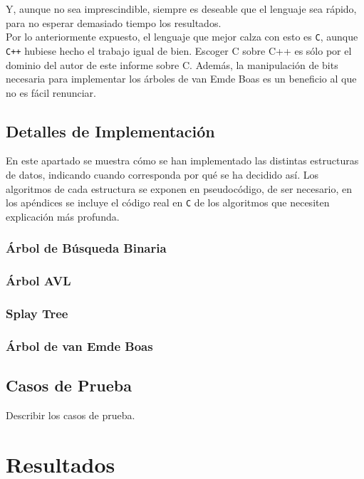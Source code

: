 \documentclass[12pt,letterpaper]{report}
\begin{document}
Y, aunque no sea imprescindible, siempre es deseable que el lenguaje sea rápido, para no esperar demasiado tiempo los resultados.\\

Por lo anteriormente expuesto, el lenguaje que mejor calza con esto es \texttt{C}, aunque \texttt{C++} hubiese hecho el trabajo igual de bien. Escoger C sobre C++ es sólo por el dominio del autor de este informe sobre C. Además, la manipulación de bits necesaria para implementar los árboles de van Emde Boas es un beneficio al que no es fácil renunciar.

\subsection{Detalles de Implementación}
\label{subsec:detalles}
En este apartado se muestra cómo se han implementado las distintas estructuras de datos, indicando cuando corresponda por qué se ha decidido así. Los algoritmos de cada estructura se exponen en pseudocódigo, de ser necesario, en los apéndices se incluye el código real en \texttt{C} de los algoritmos que necesiten explicación más profunda.

\subsubsection{Árbol de Búsqueda Binaria}

\subsubsection{Árbol AVL}

\subsubsection{Splay Tree}

\subsubsection{Árbol de van Emde Boas}


\subsection{Casos de Prueba}
\label{subsec:casos_prueba}
Describir los casos de prueba.


\section{Resultados}
\end{document}
